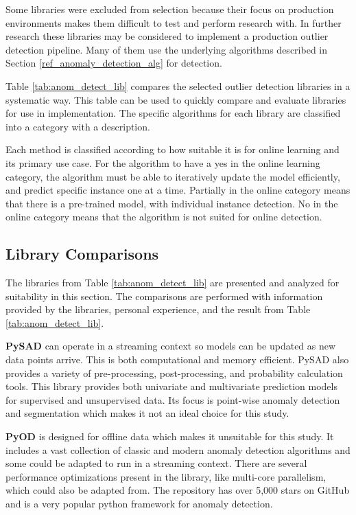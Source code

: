  
Some libraries were excluded from selection because their focus on production environments makes them difficult to test and perform research with. In further research these libraries may be considered to implement a production outlier detection pipeline. Many of them use the underlying algorithms described in Section \ref{ref_anomaly_detection_alg} for detection. 
 
Table \ref{tab:anom_detect_lib} compares the selected outlier detection libraries in a systematic way. This table can be used to quickly compare and evaluate libraries for use in implementation. The specific algorithms for each library are classified into a category with a description.
 
Each method is classified according to how suitable it is for online learning and its primary use case. For the algorithm to have a yes in the online learning category, the algorithm must be able to iteratively update the model efficiently, and predict specific instance one at a time. Partially in the online category means that there is a pre-trained model, with individual instance detection. No in the online category means that the algorithm is not suited for online detection. 




\subsection{Library Comparisons}

The libraries from Table \ref{tab:anom_detect_lib} are presented and analyzed for suitability in this section. The comparisons are performed with information provided by the libraries, personal experience, and the result from Table \ref{tab:anom_detect_lib}.

\textbf{PySAD} \parencite{pysad} can operate in a streaming context so models can be updated as new data points arrive. This is both computational and memory efficient. PySAD also provides a variety of pre-processing, post-processing, and probability calculation tools. This library provides both univariate and multivariate prediction models for supervised and unsupervised data. Its focus is point-wise anomaly detection and segmentation which makes it not an ideal choice for this study.


\textbf{PyOD} \parencite{zhao2019pyod} is designed for offline data which makes it unsuitable for this study. It includes a vast collection of classic and modern anomaly detection algorithms and some could be adapted to run in a streaming context. There are several performance optimizations present in the library, like multi-core parallelism, which could also be adapted from. The repository has over 5,000 stars on GitHub and is a very popular python framework for anomaly detection.

